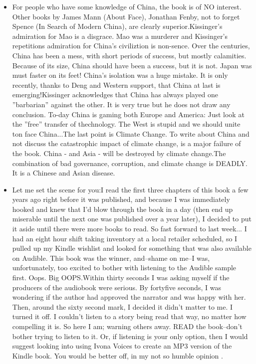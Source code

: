 \begin{itemize}
    \item For people who have some knowledge of China, the book is of NO interest. Other
books by James Mann (About Face), Jonathan Fenby, not to forget Spence (In
Search of Modern China), are clearly superior.Kissinger’s admiration for Mao
is a disgrace. Mao was a murderer and Kissinger’s repetitions admiration for
China’s civiliztion is non-sence. Over the centuries, China has been a mess, with
short periods of success, but mostly calamities. Because of its size, China should
have been a success, but it is not. Japan was must faster on its feet! China’s
isolation was a huge mistake. It is only recently, thanks to Deng and Western
support, that China at last is emerging!Kissinger acknowledges that China has
always played one ”barbarian” against the other. It is very true but he does not
draw any conclusion. To-day China is gaming both Europe and America: Just
look at the ”free” transfer of thechnology. The West is stupid and we should
unite ton face China...The last point is Climate Change. To write about China and
not discuss the catastrophic impact of climate change, is a major failure of the
book. China - and Asia - will be destroyed by climate change.The combination
of bad governance, corruption, and climate change is DEADLY. It is a Chinese
and Asian disease.

    \item Let me set the scene for you:I read the first three chapters of this book a few
years ago right before it was published, and because I was immediately hooked
and knew that I’d blow through the book in a day (then end up miserable until
the next one was published over a year later), I decided to put it aside until there
were more books to read. So fast forward to last week... I had an eight hour shift taking inventory at a local retailer scheduled, so I pulled up my Kindle
wishlist and looked for something that was also available on Audible. This book
was the winner, and–shame on me–I was, unfortunately, too excited to bother
with listening to the Audible sample first. Oops. Big OOPS.Within thirty seconds
I was asking myself if the producers of the audiobook were serious. By fortyfive seconds, I was wondering if the author had approved the narrator and was
happy with her. Then, around the sixty second mark, I decided it didn’t matter
to me. I turned it off. I couldn’t listen to a story being read that way, no matter
how compelling it is. So here I am; warning others away. READ the book–don’t
bother trying to listen to it. Or, if listening is your only option, then I would
suggest looking into using Ivona Voices to create an MP3 version of the Kindle
book. You would be better off, in my not so humble opinion .


\end{itemize}
